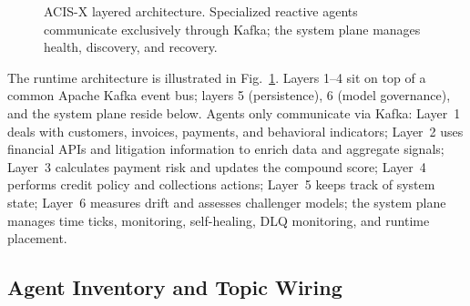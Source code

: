\documentclass[conference]{IEEEtran}
\begin{document}
\begin{figure}[t]
{%
}
\caption{ACIS-X layered architecture. Specialized reactive agents communicate exclusively through Kafka; the system plane manages health, discovery, and recovery.}
\label{fig:arch}
\end{figure}

The runtime architecture is illustrated in Fig.~\ref{fig:arch}. Layers 1--4 sit on top of a common Apache Kafka event bus; layers 5 (persistence), 6 (model governance), and the system plane reside below. Agents only communicate via Kafka: Layer~1 deals with customers, invoices, payments, and behavioral indicators; Layer~2 uses financial APIs and litigation information to enrich data and aggregate signals; Layer~3 calculates payment risk and updates the compound score; Layer~4 performs credit policy and collections actions; Layer~5 keeps track of system state; Layer~6 measures drift and assesses challenger models; the system plane manages time ticks, monitoring, self-healing, DLQ monitoring, and runtime placement.

\subsection{Agent Inventory and Topic Wiring}
\end{document}
